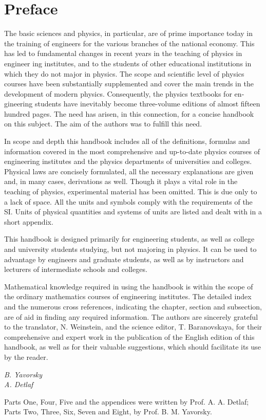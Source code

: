 

\chapter{Preface}
The basic sciences and physics, in particular, are of prime importance today in the training of engineers for the various branches of the national economy. This has led to fundamental changes in recent years in the teaching of physics in engineer­ ing institutes, and to the students of other educational insti­tutions in which they do not major in physics. The scope and scientific level of physics courses have been substantially sup­plemented and cover the main trends in the development of modern physics. Consequently, the physics textbooks for en­gineering students have inevitably become three-volume edi­tions of almost fifteen hundred pages. The need has arisen, in this connection, for a concise handbook on this subject. The aim of the authors was to fulfill this need.

In scope and depth this handbook includes all of the defini­tions, formulas and information covered in the most comprehen­sive and up-to-date physics courses of engineering institutes and the physics departments of universities and colleges. Physi­cal laws are concisely formulated, all the necessary explana­tions are given and, in many cases, derivations as well. Though it plays a vital role in the teaching of physics, experimental ma­terial has been omitted. This is due only to a lack of space. All the units and symbols comply with the requirements of the SI. Units of physical quantities and systems of units are listed and dealt with in a short appendix.

This handbook is designed primarily for engineering students, as well as college and university students studying, but not majoring in physics. It can be used to advantage by engineers and graduate students, as well as by instructors and lecturers of intermediate schools and colleges.

Mathematical knowledge required in using the handbook is within the scope of the ordinary mathematics courses of engi­neering institutes. The detailed index and the numerous cross references, indicating the chapter, section and subsection, are of aid in finding any required information. The authors are sincerely grateful to the translator, N. Weinstein, and the science editor, T. Baranovskaya, for their comprehensive and expert work in the publication of the English edition of this handbook, as well as for their valuable suggestions, which should facilitate its use by the reader.
\begin{flushright}
\textit{B. Yavorsky\\ A. Detlaf}
\end{flushright}

Parts One, Four, Five and the appendices were written by Prof. A. A. Detlaf; Parts Two, Three, Six, Seven and Eight, by Prof. B. M. Yavorsky.
